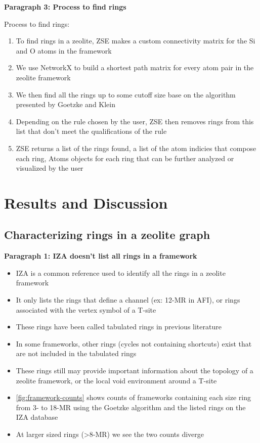 \documentclass[11pt]{article}
\begin{document}
\textbf{\textbf{Paragraph 3: Process to find rings}}

Process to find rings:
\begin{enumerate}
\item To find rings in a zeolite, ZSE makes a custom connectivity matrix for the Si and O atoms in the framework
\item We use NetworkX \cite{hagberg-exploring-2008} to build a shortest path matrix for every atom pair in the zeolite framework
\item We then find all the rings up to some cutoff size base on the algorithm presented by Goetzke and Klein \cite{goetzke-properties-1991}
\item Depending on the rule chosen by the user, ZSE then removes rings from this list that don't meet the qualifications of the rule
\item ZSE returns a list of the rings found, a list of the atom indicies that compose each ring, Atoms objects for each ring that can be further analyzed or visualized by the user
\end{enumerate}


\section{Results and Discussion}
\label{sec:org2e12605}
\subsection{Characterizing rings in a zeolite graph}
\label{sec:org9599689}
\textbf{\textbf{Paragraph 1: IZA doesn't list all rings in a framework}}
\begin{itemize}
\item IZA is a common reference used to identify all the rings in a zeolite framework
\item It only lists the rings that define a channel (ex: 12-MR in AFI), or rings associated with the vertex symbol of a T-site
\item These rings have been called tabulated rings in previous literature \cite{curtis-statistical-2003}
\item In some frameworks, other rings (cycles not containing shortcuts) exist that are not included in the tabulated rings
\item These rings still may provide important information about the topology of a zeolite framework, or the local void environment around a T-site
\item \cref{fig:framework-counts} shows counts of frameworks containing each size ring from 3- to 18-MR using the Goetzke algorithm and the listed rings on the IZA database
\item At larger sized rings (>8-MR) we see the two counts diverge
\end{itemize}
\end{document}
